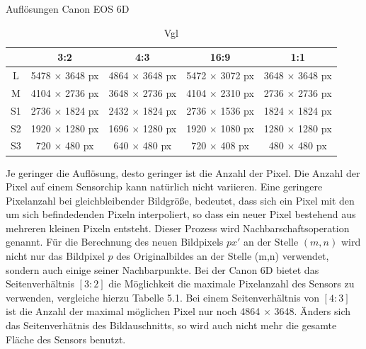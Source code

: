 	\begin{table}[h]
	\centering
	\caption{Auflösungen Canon EOS 6D}
	\label{my-label}
	\begin{tabular}{c|c|c|c|c}
		\hline
		\rowcolor{blue!25} 	& 3:2 & 4:3 & 16:9 & 1:1 \\\hline		
		L	&  5478 $\times$ 3648 px & 4864 $\times$ 3648 px & 5472 $\times$ 3072 px & 3648 $\times$ 3648 px \\\hline		
		M &  4104 $\times$ 2736 px & 3648 $\times$ 2736 px & 4104 $\times$ 2310 px & 2736 $\times$ 2736 px \\\hline
		S1 &  2736 $\times$ 1824 px & 2432 $\times$ 1824 px & 2736 $\times$ 1536 px & 1824 $\times$ 1824 px \\\hline
		S2&  1920 $\times$ 1280 px & 1696 $\times$ 1280 px & 1920 $\times$ 1080 px & 1280 $\times$ 1280 px \\\hline
		S3&  720 $\times$ 480 px & 640 $\times$ 480 px & 720 $\times$ 408 px & 480 $\times$ 480 px \\\hline
	\end{tabular}
\caption{Vgl \cite{Canon6D}}
\end{table}

Je geringer die Auflösung, desto geringer ist die Anzahl der Pixel. Die Anzahl der Pixel auf einem Sensorchip kann natürlich nicht variieren. Eine geringere Pixelanzahl bei gleichbleibender Bildgröße, bedeutet, dass sich ein Pixel mit den um sich befindedenden Pixeln interpoliert, so dass ein neuer Pixel bestehend aus mehreren kleinen Pixeln entsteht. Dieser Prozess wird Nachbarschaftsoperation genannt. Für die Berechnung des neuen Bildpixels $px'$ an der Stelle $(m,n)$ wird nicht nur das Bildpixel $p$ des Originalbildes an der Stelle (m,n) verwendet, sondern auch einige seiner Nachbarpunkte\cite{Photonik}. Bei der Canon 6D bietet das Seitenverhältnis $[3:2]$ die Möglichkeit die maximale Pixelanzahl des Sensors zu verwenden, vergleiche hierzu Tabelle 5.1. Bei einem Seitenverhältnis von $[4:3]$ ist die Anzahl der maximal möglichen Pixel nur noch 4864 $\times$ 3648. Änders sich das Seitenverhätnis des Bildauschnitts, so wird auch nicht mehr die gesamte Fläche des Sensors benutzt. 

